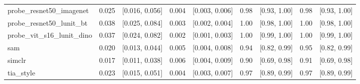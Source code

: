 \begin{tabular}{lrrrrrrrr}
probe\_resnet50\_imagenet & 0.025 & [0.016, 0.056] & 0.004 & [0.003, 0.006] & 0.98 & [0.93, 1.00] & 0.98 & [0.93, 1.00] \\
probe\_resnet50\_lunit\_bt & 0.038 & [0.025, 0.084] & 0.003 & [0.002, 0.004] & 1.00 & [0.98, 1.00] & 1.00 & [0.98, 1.00] \\
probe\_vit\_s16\_lunit\_dino & 0.037 & [0.024, 0.082] & 0.002 & [0.001, 0.003] & 1.00 & [0.99, 1.00] & 1.00 & [0.99, 1.00] \\
sam & 0.020 & [0.013, 0.044] & 0.005 & [0.004, 0.008] & 0.94 & [0.82, 0.99] & 0.95 & [0.82, 0.99] \\
simclr & 0.017 & [0.011, 0.038] & 0.006 & [0.004, 0.009] & 0.90 & [0.69, 0.98] & 0.91 & [0.69, 0.98] \\
tia\_style & 0.023 & [0.015, 0.051] & 0.004 & [0.003, 0.007] & 0.97 & [0.89, 0.99] & 0.97 & [0.89, 0.99] \\
\bottomrule
\end{tabular}
